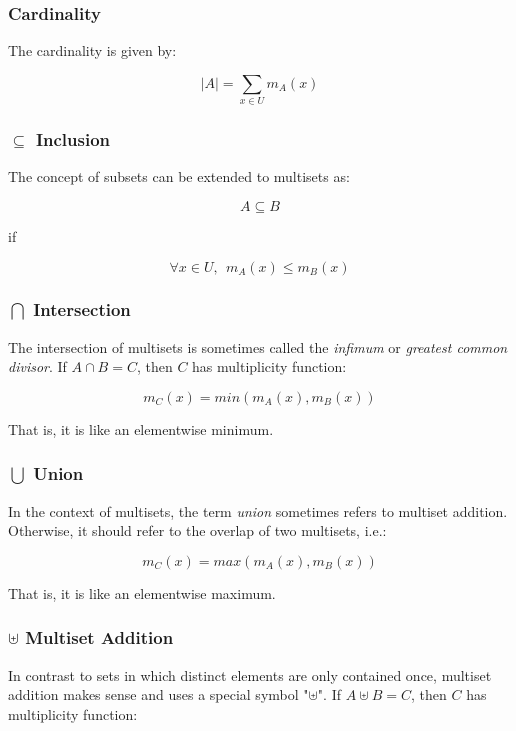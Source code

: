 \subsubsection{Cardinality}

The cardinality is given by:

\begin{equation}
|A| = \sum_{x\in U} m_A(x)
\end{equation}

\subsubsection{$\subseteq$ Inclusion}
The concept of subsets can be extended to multisets as:

\begin{equation}
A \subseteq B
\end{equation}

if 

\begin{equation}
\forall x\in U, \ \ m_A(x) \leq m_B(x)
\end{equation}


\subsubsection{$\bigcap$ Intersection}
The intersection of multisets is sometimes called the \textit{infimum} or \textit{greatest common divisor}. If $A\cap B = C$, then $C$ has multiplicity function:

\begin{equation}
m_C(x) = min\left(m_A(x),m_B(x)\right)
\end{equation}

That is, it is like an elementwise minimum.

\subsubsection{$\bigcup$ Union}
In the context of multisets, the term \textit{union} sometimes refers to multiset addition. Otherwise, it should refer to the overlap of two multisets, i.e.:
 
\begin{equation}
m_C(x) = max\left(m_A(x),m_B(x)\right)
\end{equation}

That is, it is like an elementwise maximum.

\subsubsection{$\uplus$ Multiset Addition} 
In contrast to sets in which distinct elements are only contained once, multiset addition makes sense and uses a special symbol "$\uplus$". If $A\uplus B = C$, then $C$ has multiplicity function:

